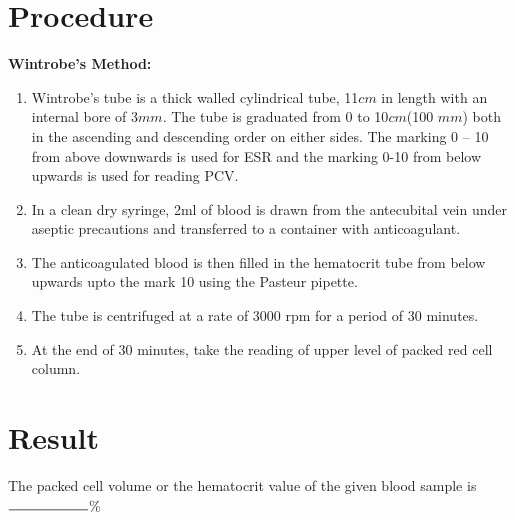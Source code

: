 \documentclass[a4paper,12pt,openany,twoside]{book}
\begin{document}
													\section*{Procedure}
													\textbf{Wintrobe's Method:}\newline
													\begin{enumerate}
														\item{Wintrobe’s tube is a thick walled cylindrical tube, 11$cm$ in length with an internal bore of 3$mm$. The tube is graduated from 0 to 10$cm$(100 $mm$) both in the ascending and descending order on either sides. The marking 0 – 10 from above downwards is used for ESR and the marking 0-10 from below upwards is used for reading PCV.}
														\item{In a clean dry syringe, 2ml of blood is drawn from the antecubital vein under aseptic precautions and transferred to a container with anticoagulant.}
														\item{The anticoagulated blood is then filled in the hematocrit tube from below upwards upto the mark 10 using the Pasteur pipette.}
														\item{The tube is centrifuged at a rate of 3000 rpm for a period of 30 minutes.}
														\item{At the end of 30 minutes, take the reading of upper level of packed red cell column.}
													\end{enumerate}
													\section*{Result}
													The packed cell volume or the hematocrit value of the given blood sample is $\rule{2cm}{.5pt}$\%
\end{document}
